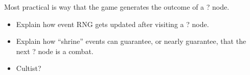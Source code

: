 \documentclass[12pt]{amsart}
\begin{document}
Most practical is way that the game generates the outcome of a ? node.  
\begin{itemize}
    \item 
        Explain how event RNG gets updated after visiting a ? node.  
    \item 
        Explain how ``shrine'' events can guarantee, or nearly guarantee, that the next ? node is a combat.  
    \item 
        Cultist? 
\end{itemize}


\newpage


\end{document}
